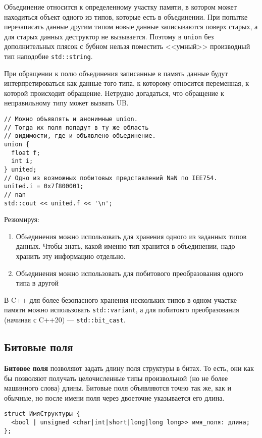 Объединение относится к определенному участку памяти, в котором может находиться объект одного из типов,
которые есть в объединении. При попытке перезаписать данные другим типом новые данные записываются
поверх старых, а для старых данных деструктор не вызывается. Поэтому в \verb|union| без
дополнительных плясок с бубном нельзя поместить <<умный>> производный тип наподобие \verb|std::string|.

При обращении к полю объединения записанные в память данные будут
интерпретироваться как данные того типа, к которому относится переменная, к которой происходит
обращение. Нетрудно догадаться, что обращение к неправильному типу может вызвать UB.

\begin{verbatim}
// Можно объявлять и анонимные union.
// Тогда их поля попадут в ту же область
// видимости, где и объявлено объединение.
union {
  float f;
  int i;
} united;
// Одно из возможных побитовых представлений NaN по IEE754.
united.i = 0x7f800001;
// nan
std::cout << united.f << '\n';
\end{verbatim}

Резюмируя:
\begin{enumerate}
  \item Объединения можно использовать для хранения одного из заданных типов данных. Чтобы знать,
  какой именно тип хранится в объединении, надо хранить эту информацию отдельно.
  \item Объединения можно использовать для побитового преобразования одного типа в другой
\end{enumerate}

{\small В C++ для более безопасного хранения нескольких типов в одном участке памяти можно использовать
\verb|std::variant|, а для побитовго преобразования (начиная с C++20) --- \verb|std::bit_cast|.}

\subsection*{Битовые поля}
\textbf{Битовое поля} позволяют задать длину поля структуры в битах. %
То есть, они как бы позволяют получать целочисленные типы произвольной (но не
более машинного слова) длины. Битовые поля объявляются точно так же, как и обычные,
но после имени поля через двоеточие указывается его длина.
\begin{verbatim}
struct ИмяСтруктуры {
  <bool | unsigned <char|int|short|long|long long>> имя_поля: длина;
};
\end{verbatim}


